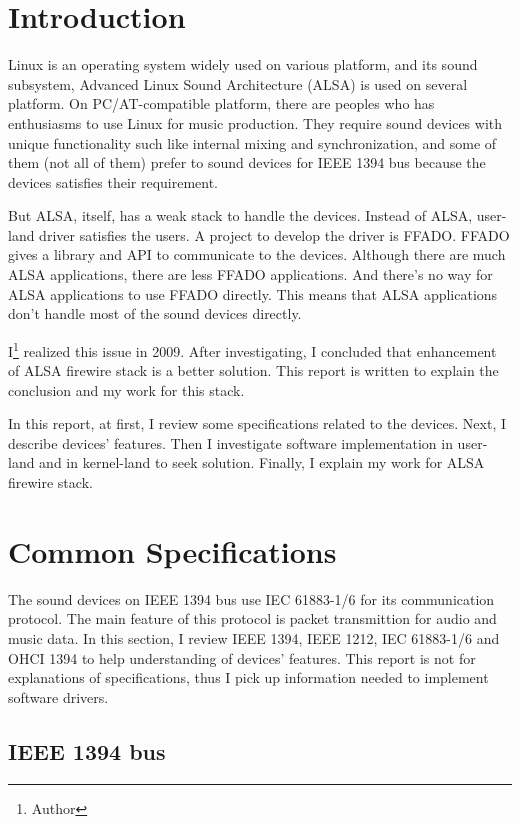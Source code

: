 \documentclass[onecolumn]{article}
\begin{document}

\section{Introduction}

Linux is an operating system widely used on various platform, and its sound subsystem, Advanced Linux Sound Architecture (ALSA) is used on several platform. On PC/AT-compatible platform, there are peoples who has enthusiasms to use Linux for music production. They require sound devices with unique functionality such like internal mixing and synchronization, and some of them (not all of them) prefer to sound devices for IEEE 1394 bus because the devices satisfies their requirement.

But ALSA, itself, has a weak stack to handle the devices. Instead of ALSA, user-land driver satisfies the users. A project to develop the driver is FFADO. FFADO gives a library and API to communicate to the devices. Although there are much ALSA applications, there are less FFADO applications. And there's no way for ALSA applications to use FFADO directly. This means that ALSA applications don't handle most of the sound devices directly.

I\footnote{Author} realized this issue in 2009. After investigating, I concluded that enhancement of ALSA firewire stack is a better solution. This report is written to explain the conclusion and my work for this stack.

In this report, at first, I review some specifications related to the devices. Next, I describe devices' features. Then I investigate software implementation in user-land and in kernel-land to seek solution. Finally, I explain my work for ALSA firewire stack.


\section{Common Specifications}

The sound devices on IEEE 1394 bus use IEC 61883-1/6 for its communication protocol. The main feature of this protocol is packet transmittion for audio and music data. In this section, I review IEEE 1394, IEEE 1212, IEC 61883-1/6 and OHCI 1394 to help understanding of devices' features. This report is not for explanations of specifications, thus I pick up information needed to implement software drivers.

\subsection{IEEE 1394 bus}
\end{document}

